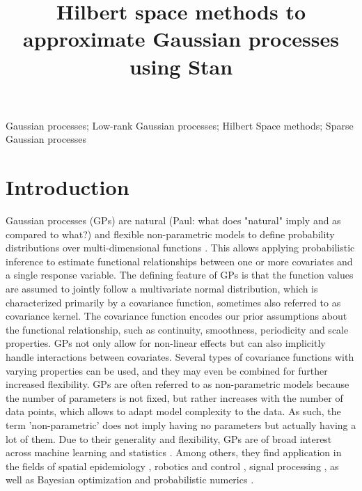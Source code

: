 \documentclass[]{interact}
\theoremstyle{plain}%
\theoremstyle{definition}
\theoremstyle{remark}
\begin{document}

\title{Hilbert space methods to approximate Gaussian processes using Stan}


\maketitle

\begin{abstract}

\end{abstract}

\begin{keywords}
Gaussian processes; Low-rank Gaussian processes; Hilbert Space methods; Sparse Gaussian processes
\end{keywords}

\tableofcontents


\newpage

\section{Introduction}\label{sec:bf_intro}

Gaussian processes (GPs) are natural (Paul: what does "natural" imply and as compared to what?) and flexible non-parametric models to define probability distributions over multi-dimensional functions \citep{rasmussen2006gaussian,neal1997monte}. This allows applying probabilistic inference to estimate functional relationships between one or more covariates and a single response variable. The defining feature of GPs is that the function values are assumed to jointly follow a multivariate normal distribution, which is characterized primarily by a covariance function, sometimes also referred to as covariance kernel. The covariance function encodes our prior assumptions about the functional relationship, such as continuity, smoothness, periodicity and scale properties. GPs not only allow for non-linear effects but can also implicitly handle interactions between covariates. Several types of covariance functions with varying properties can be used, and they may even be combined for further increased flexibility. GPs are often referred to as non-parametric models because the number of parameters is not fixed, but rather increases with the number of data points, which allows to adapt model complexity to the data. As such, the term 'non-parametric' does not imply having no parameters but actually having a lot of them. Due to their generality and flexibility, GPs are of broad interest across machine learning and statistics \citep{rasmussen2006gaussian,neal1997monte}. Among others, they find application in the fields of spatial epidemiology \citep{diggle2013statistical,carlin2014hierarchical}, robotics and control \citep{deisenroth2015gaussian}, signal processing \citep{sarkka2013spatiotemporal}, as well as Bayesian optimization and probabilistic numerics \citep{roberts2010bayesian,briol2015probabilistic,hennig2015probabilistic}.
\end{document}
